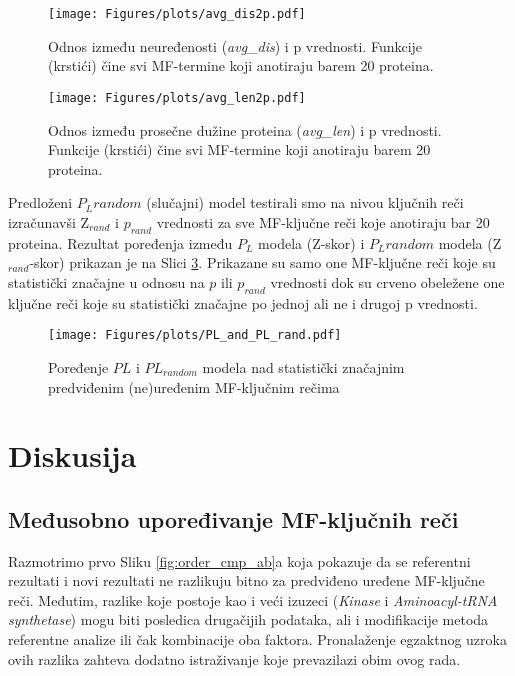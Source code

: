 \begin{figure}[th]
  \centering
\texttt{[image: Figures/plots/avg\_dis2p.pdf]}
\caption {
  Odnos između neuređenosti (\textit{avg\_dis}) i p vrednosti.
  Funkcije (krstići) čine svi MF-termine koji anotiraju barem 20 proteina.
}
\label{fig:avg_dis_vs_p}
\end{figure}

\begin{figure}[th]
  \centering
\texttt{[image: Figures/plots/avg\_len2p.pdf]}
\caption {
  Odnos između prosečne dužine proteina (\textit{avg\_len}) i p vrednosti.
  Funkcije (krstići) čine svi MF-termine koji anotiraju barem 20 proteina.
}
\label{fig:avg_len_vs_p}
\end{figure}



Predloženi $P_L random$ (slučajni) model testirali smo na nivou ključnih reči
izračunavši Z$_{rand}$ i  $p_{rand}$ vrednosti za sve MF-ključne reči koje
anotiraju bar 20 proteina. Rezultat poređenja između $P_L$
modela (Z-skor) i $P_L random$ modela (Z$_{rand}$-skor) prikazan je na Slici
\ref{fig:PLrand}. Prikazane su samo one MF-ključne reči koje su statistički
značajne u odnosu na $p$ ili $p_{rand}$ vrednosti dok su crveno obeležene one
ključne reči koje su statistički značajne po jednoj ali ne i drugoj p
vrednosti.


\begin{figure}[th]
\hspace*{-2.5cm} 
\centering
\texttt{[image: Figures/plots/PL\_and\_PL\_rand.pdf]}
\caption {
  Poređenje $PL$ i $PL_{random}$ modela nad statistički značajnim predviđenim (ne)uređenim MF-ključnim rečima
}
\label{fig:PLrand}
\end{figure}




\chapter{Diskusija} %

\label{Diskusija} %

\section{Međusobno upoređivanje MF-ključnih reči}

Razmotrimo prvo Sliku \ref{fig:order_cmp_ab}a koja pokazuje da se referentni
rezultati i novi rezultati ne razlikuju bitno za predviđeno uređene MF-ključne
reči. Međutim, razlike koje postoje kao i veći izuzeci (\textit{Kinase} i
\textit{Aminoacyl-tRNA synthetase})  mogu biti posledica drugačijih podataka,
ali i modifikacije metoda referentne analize ili čak kombinacije oba faktora.
Pronalaženje egzaktnog uzroka ovih razlika zahteva dodatno istraživanje koje
prevazilazi obim ovog rada.

